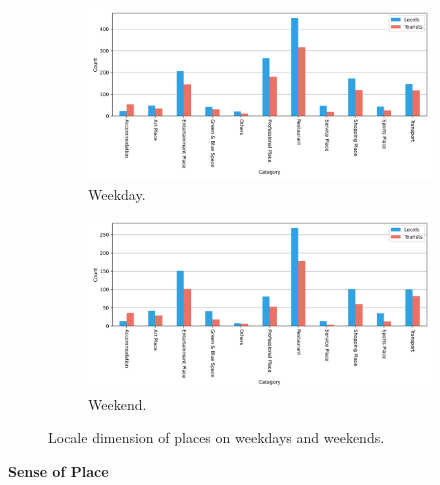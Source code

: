 \documentclass{article}
\theoremstyle{remark}
\begin{document}
\begin{figure}[!h]

\centering
\begin{subfigure}{0.6\textheight}
\centering
\includegraphics[width=0.9\linewidth]{figures/places_locale_weekday.png}
\caption{Weekday.}
\label{fig:places_locale_weekday}
\end{subfigure}
\begin{subfigure}{0.6\textheight}
\centering
\includegraphics[width=0.9\linewidth]{figures/places_locale_weekend.png}
\caption{Weekend.}
\label{fig:places_locale_weekend}
\end{subfigure}

\caption{Locale dimension of places on weekdays and weekends.}
\label{fig:places_locale_week}
\end{figure}



\textbf{Sense of Place}
\end{document}
